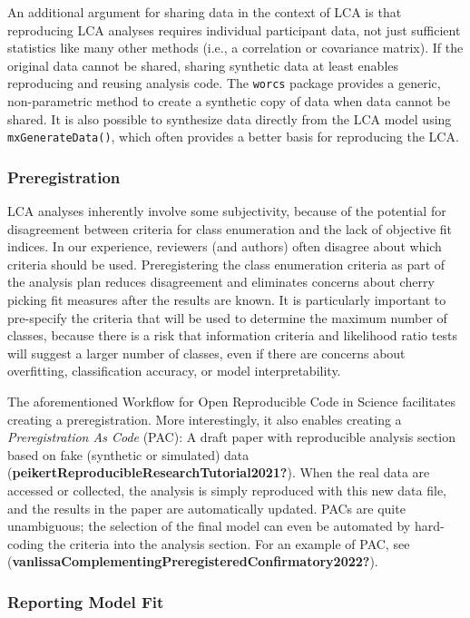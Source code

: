 \documentclass[
  ,man,floatsintext]{apa6}
\begin{document}
An additional argument for sharing data in the context of LCA is that reproducing LCA analyses requires individual participant data,
not just sufficient statistics like many other methods (i.e., a correlation or covariance matrix).
If the original data cannot be shared,
sharing synthetic data at least enables reproducing and reusing analysis code.
The \texttt{worcs} package provides a generic, non-parametric method to create a synthetic copy of data when data cannot be shared.
It is also possible to synthesize data directly from the LCA model using \texttt{mxGenerateData()},
which often provides a better basis for reproducing the LCA.

\hypertarget{preregistration}{%
\subsubsection{Preregistration}\label{preregistration}}

LCA analyses inherently involve some subjectivity,
because of the potential for disagreement between criteria for class enumeration and the lack of objective fit indices.
In our experience, reviewers (and authors) often disagree about which criteria should be used.
Preregistering the class enumeration criteria as part of the analysis plan reduces disagreement and eliminates concerns about cherry picking fit measures after the results are known.
It is particularly important to pre-specify the criteria that will be used to determine the maximum number of classes,
because there is a risk that information criteria and likelihood ratio tests will suggest a larger number of classes, even if there are concerns about overfitting, classification accuracy, or model interpretability.

The aforementioned Workflow for Open Reproducible Code in Science facilitates creating a preregistration.
More interestingly, it also enables creating a \emph{Preregistration As Code} (PAC):
A draft paper with reproducible analysis section based on fake (synthetic or simulated) data (\textbf{peikertReproducibleResearchTutorial2021?}).
When the real data are accessed or collected,
the analysis is simply reproduced with this new data file,
and the results in the paper are automatically updated.
PACs are quite unambiguous; the selection of the final model can even be automated by hard-coding the criteria into the analysis section.
For an example of PAC, see (\textbf{vanlissaComplementingPreregisteredConfirmatory2022?}).

\hypertarget{reporting-model-fit}{%
\subsubsection{Reporting Model Fit}\label{reporting-model-fit}}
\end{document}
